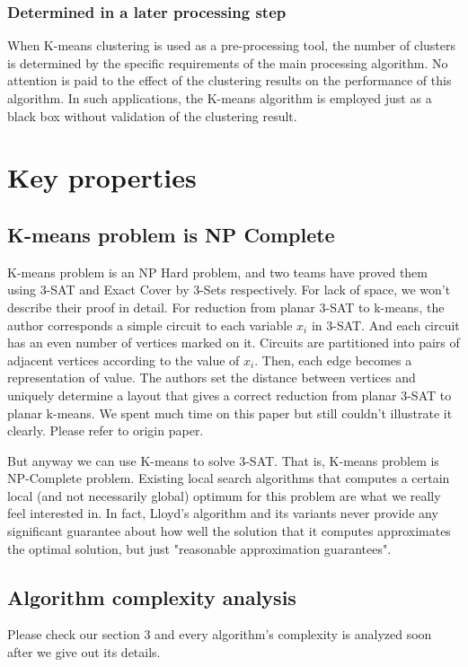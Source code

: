 \documentclass[11pt]{article}
\begin{document}
\subsubsection{Determined in a later processing step}
When K-means clustering is used as a pre-processing tool, the number of clusters is determined by the specific requirements of the main processing algorithm. No attention is paid to the effect of the clustering results on the performance of this algorithm. In such applications, the K-means algorithm is employed just as a black box without validation of the clustering result. \par

\section{Key properties}
\subsection{K-means problem is NP Complete}
K-means problem is an NP Hard problem, and two teams have proved them using 3-SAT and Exact Cover by 3-Sets respectively.\cite{npc-prove,Vattani_thehardness}  For lack of space, we won't describe their proof in detail. For reduction from planar 3-SAT to k-means, the author corresponds a simple circuit to each variable $x_i$ in 3-SAT. And each circuit has an even number of vertices marked on it. Circuits are partitioned into pairs of adjacent vertices according to the value of $x_i$. Then, each edge becomes a representation of value. The authors set the distance between vertices and uniquely determine a layout that gives a correct reduction from planar 3-SAT to planar k-means. We spent much time on this paper but still couldn't illustrate it clearly. Please refer to origin paper. \par
But anyway we can use K-means to solve 3-SAT. That is, K-means problem is NP-Complete problem. Existing local search algorithms that computes a certain local (and not necessarily global) optimum for this problem are what we really feel interested in. In fact, Lloyd's algorithm and its variants never  provide any significant guarantee about how well the solution that it computes approximates the optimal solution, but just "reasonable approximation guarantees".

\subsection{Algorithm complexity analysis}
Please check our section 3 and every algorithm's complexity is analyzed soon after we give out its details.
\end{document}

